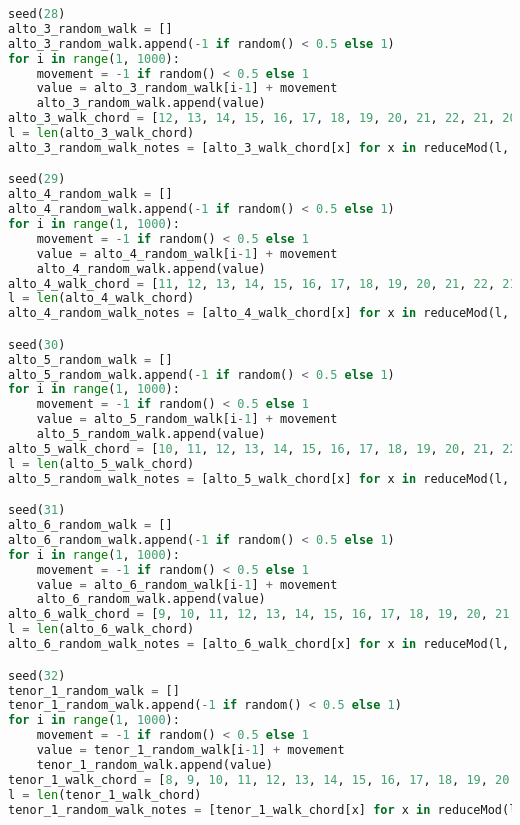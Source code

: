 \begin{lstlisting}[language=Python, caption=Invocation Source Code]
seed(28)
alto_3_random_walk = []
alto_3_random_walk.append(-1 if random() < 0.5 else 1)
for i in range(1, 1000):
    movement = -1 if random() < 0.5 else 1
    value = alto_3_random_walk[i-1] + movement
    alto_3_random_walk.append(value)
alto_3_walk_chord = [12, 13, 14, 15, 16, 17, 18, 19, 20, 21, 22, 21, 20, 19, 18, 17, 16, 15, 14, 13, 12, 11, 10, 9, 8, 7, 6, 5, 4, 3, 2, 1, 0, -1, -2, -1, 0, 1, 2, 3, 4, 5, 6, 7, 8, 9, 10, 11, ]
l = len(alto_3_walk_chord)
alto_3_random_walk_notes = [alto_3_walk_chord[x] for x in reduceMod(l, alto_3_random_walk)]

seed(29)
alto_4_random_walk = []
alto_4_random_walk.append(-1 if random() < 0.5 else 1)
for i in range(1, 1000):
    movement = -1 if random() < 0.5 else 1
    value = alto_4_random_walk[i-1] + movement
    alto_4_random_walk.append(value)
alto_4_walk_chord = [11, 12, 13, 14, 15, 16, 17, 18, 19, 20, 21, 22, 21, 20, 19, 18, 17, 16, 15, 14, 13, 12, 11, 10, 9, 8, 7, 6, 5, 4, 3, 2, 1, 0, -1, -2, -1, 0, 1, 2, 3, 4, 5, 6, 7, 8, 9, 10, ]
l = len(alto_4_walk_chord)
alto_4_random_walk_notes = [alto_4_walk_chord[x] for x in reduceMod(l, alto_4_random_walk)]

seed(30)
alto_5_random_walk = []
alto_5_random_walk.append(-1 if random() < 0.5 else 1)
for i in range(1, 1000):
    movement = -1 if random() < 0.5 else 1
    value = alto_5_random_walk[i-1] + movement
    alto_5_random_walk.append(value)
alto_5_walk_chord = [10, 11, 12, 13, 14, 15, 16, 17, 18, 19, 20, 21, 22, 21, 20, 19, 18, 17, 16, 15, 14, 13, 12, 11, 10, 9, 8, 7, 6, 5, 4, 3, 2, 1, 0, -1, -2, -1, 0, 1, 2, 3, 4, 5, 6, 7, 8, 9, ]
l = len(alto_5_walk_chord)
alto_5_random_walk_notes = [alto_5_walk_chord[x] for x in reduceMod(l, alto_5_random_walk)]

seed(31)
alto_6_random_walk = []
alto_6_random_walk.append(-1 if random() < 0.5 else 1)
for i in range(1, 1000):
    movement = -1 if random() < 0.5 else 1
    value = alto_6_random_walk[i-1] + movement
    alto_6_random_walk.append(value)
alto_6_walk_chord = [9, 10, 11, 12, 13, 14, 15, 16, 17, 18, 19, 20, 21, 22, 21, 20, 19, 18, 17, 16, 15, 14, 13, 12, 11, 10, 9, 8, 7, 6, 5, 4, 3, 2, 1, 0, -1, -2, -1, 0, 1, 2, 3, 4, 5, 6, 7, 8, ]
l = len(alto_6_walk_chord)
alto_6_random_walk_notes = [alto_6_walk_chord[x] for x in reduceMod(l, alto_6_random_walk)]

seed(32)
tenor_1_random_walk = []
tenor_1_random_walk.append(-1 if random() < 0.5 else 1)
for i in range(1, 1000):
    movement = -1 if random() < 0.5 else 1
    value = tenor_1_random_walk[i-1] + movement
    tenor_1_random_walk.append(value)
tenor_1_walk_chord = [8, 9, 10, 11, 12, 13, 14, 15, 16, 17, 18, 19, 20, 21, 22, 21, 20, 19, 18, 17, 16, 15, 14, 13, 12, 11, 10, 9, 8, 7, 6, 5, 4, 3, 2, 1, 0, -1, -2, -1, 0, 1, 2, 3, 4, 5, 6, 7, ]
l = len(tenor_1_walk_chord)
tenor_1_random_walk_notes = [tenor_1_walk_chord[x] for x in reduceMod(l, tenor_1_random_walk)]


\end{lstlisting}
